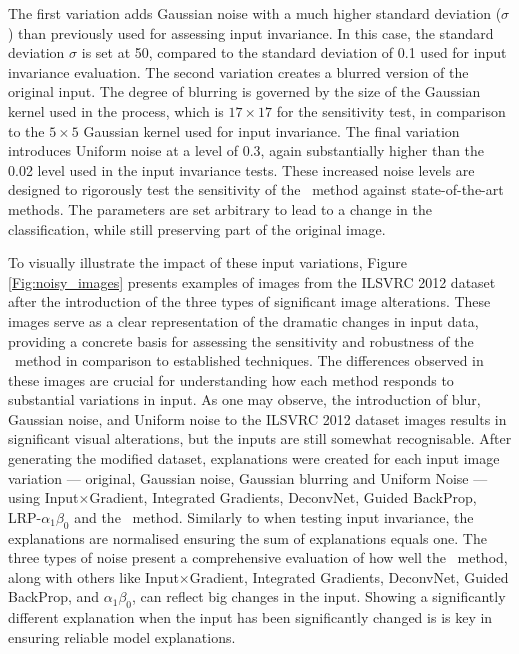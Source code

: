 The first variation adds Gaussian noise with a much higher standard deviation ($\sigma$) than previously used for assessing input invariance. In this case, the standard deviation $\sigma$ is set at 50, compared to the standard deviation of 0.1 used for input invariance evaluation. The second variation creates a blurred version of the original input. The degree of blurring is governed by the size of the Gaussian kernel used in the process, which is $17 \times 17$ for the sensitivity test, in comparison to the $5 \times 5$ Gaussian kernel used for input invariance. The final variation introduces Uniform noise at a level of 0.3, again substantially higher than the 0.02 level used in the input invariance tests. These increased noise levels are designed to rigorously test the sensitivity of the \CTC\ method against state-of-the-art methods. The parameters are set arbitrary to lead to a change in the classification, while still preserving part of the original image.

To visually illustrate the impact of these input variations, Figure \ref{Fig:noisy_images} presents examples of images from the ILSVRC 2012 dataset after the introduction of the three types of significant image alterations. These images serve as a clear representation of the dramatic changes in input data, providing a concrete basis for assessing the sensitivity and robustness of the \CTC\ method in comparison to established techniques. The differences observed in these images are crucial for understanding how each method responds to substantial variations in input. As one may observe, the introduction of blur, Gaussian noise, and Uniform noise to the ILSVRC 2012 dataset images results in significant visual alterations, but the inputs are still somewhat recognisable. After generating the modified dataset, explanations were created for each input image variation --- original, Gaussian noise, Gaussian blurring and Uniform Noise --- using Input$\times$Gradient, Integrated Gradients, DeconvNet, Guided BackProp, LRP-$\alpha_1\beta_0$ and the \CTC\ method.  Similarly to when testing input invariance, the explanations are normalised ensuring the sum of explanations equals one. The three types of noise present a comprehensive evaluation of how well the \CTC\ method, along with others like Input$\times$Gradient, Integrated Gradients, DeconvNet, Guided BackProp, and \LRP\-$\alpha_1\beta_0$, can reflect big changes in the input. Showing a significantly different explanation when the input has been significantly changed is is key in ensuring reliable model explanations. 


